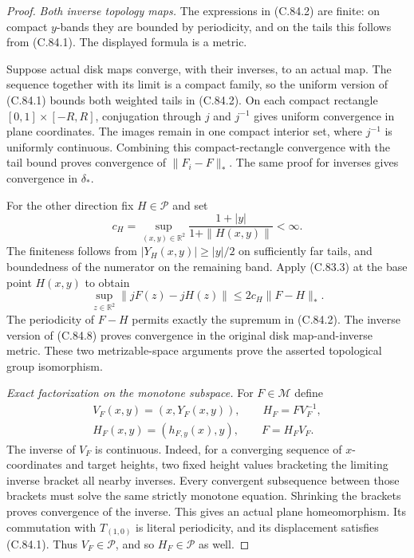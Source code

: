 \begin{proof}
\emph{Both inverse topology maps.}
The expressions in (C.84.2) are finite:
on compact $y$-bands they are bounded
by periodicity, and on the tails this
follows from (C.84.1).
The displayed formula is a metric.

Suppose actual disk maps converge,
with their inverses, to an actual map.
The sequence together with its limit
is a compact family, so the uniform
version of (C.84.1) bounds both weighted
tails in (C.84.2). On each compact
rectangle $[0,1]\times[-R,R]$,
conjugation through $j$ and $j^{-1}$
gives uniform convergence in plane
coordinates. The images remain in
one compact interior set, where
$j^{-1}$ is uniformly continuous.
Combining this compact-rectangle
convergence with the tail bound proves
convergence of $\|F_i-F\|_*$.
The same proof for inverses gives
convergence in $\delta_*$.

For the other direction fix
$H\in\mathscr P$ and set
\[
 c_H=\sup_{(x,y)\in\mathbb R^2}
       \frac{1+|y|}{1+\|H(x,y)\|}<\infty.
                                                               \tag{C.84.7}
\]
The finiteness follows from
$|Y_H(x,y)|\geq|y|/2$ on sufficiently
far tails, and boundedness of the
numerator on the remaining band.
Apply (C.83.3) at the base point
$H(x,y)$ to obtain
\[
 \sup_{z\in\mathbb R^2}\|jF(z)-jH(z)\|
             \leq2c_H\|F-H\|_*.
                                                               \tag{C.84.8}
\]
The periodicity of $F-H$ permits
exactly the supremum in (C.84.2).
The inverse version of (C.84.8)
proves convergence in the original
disk map-and-inverse metric.
These two metrizable-space arguments
prove the asserted topological group
isomorphism.

\emph{Exact factorization on the monotone subspace.}
For $F\in\mathscr M$ define
\[
 \begin{gathered}
 V_F(x,y)=(x,Y_F(x,y)),\qquad
 H_F=F V_F^{-1},\\
 H_F(x,y)=(h_{F,y}(x),y),\qquad F=H_F V_F.
 \end{gathered}                                                  \tag{C.84.9}
\]
The inverse of $V_F$ is continuous.
Indeed, for a converging sequence of
$x$-coordinates and target heights,
two fixed height values bracketing
the limiting inverse bracket all
nearby inverses. Every convergent
subsequence between those brackets
must solve the same strictly monotone
equation. Shrinking the brackets
proves convergence of the inverse.
This gives an actual plane homeomorphism.
Its commutation with $T_{(1,0)}$
is literal periodicity, and its
displacement satisfies (C.84.1).
Thus $V_F\in\mathscr P$, and so
$H_F\in\mathscr P$ as well.


\end{proof}
